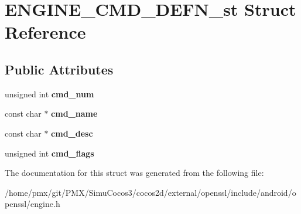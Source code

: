 \hypertarget{structENGINE__CMD__DEFN__st}{}\section{E\+N\+G\+I\+N\+E\+\_\+\+C\+M\+D\+\_\+\+D\+E\+F\+N\+\_\+st Struct Reference}
\label{structENGINE__CMD__DEFN__st}
\subsection*{Public Attributes}
\begin{DoxyCompactItemize}
\item 
\mbox{\label{structENGINE__CMD__DEFN__st_a4868776e2cc8f219c161072902b27761}} 
unsigned int {\bfseries cmd\+\_\+num}
\item 
\mbox{\label{structENGINE__CMD__DEFN__st_ace53e9048b8d906c0f82ea1f53408a27}} 
const char $\ast$ {\bfseries cmd\+\_\+name}
\item 
\mbox{\label{structENGINE__CMD__DEFN__st_a1227dbb722dbcbdd3dbb90488c71835b}} 
const char $\ast$ {\bfseries cmd\+\_\+desc}
\item 
\mbox{\label{structENGINE__CMD__DEFN__st_aa2dae056d36094415cdc11e6c7cac4a5}} 
unsigned int {\bfseries cmd\+\_\+flags}
\end{DoxyCompactItemize}


The documentation for this struct was generated from the following file\+:\begin{DoxyCompactItemize}
\item 
/home/pmx/git/\+P\+M\+X/\+Simu\+Cocos3/cocos2d/external/openssl/include/android/openssl/engine.\+h\end{DoxyCompactItemize}
